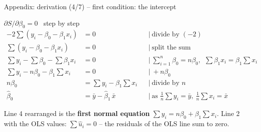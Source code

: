\documentclass[aspectratio=169,11pt]{beamer}
\newcommand{\tsum}{\textstyle\sum}
\begin{document}
\begin{frame}{Appendix: derivation (4/7) -- first condition: the intercept}
  \begin{block}{$\partial S / \partial \beta_0 = 0$ \ step by step}
    \begin{align*}
      -2\tsum (y_i - \beta_0 - \beta_1 x_i) &= 0
        && \mid\ \text{divide by } (-2) \\
      \tsum (y_i - \beta_0 - \beta_1 x_i) &= 0
        && \mid\ \text{split the sum} \\
      \tsum y_i - \tsum \beta_0 - \tsum \beta_1 x_i &= 0
        && \mid\ \tsum_{i=1}^{n} \beta_0 = n\beta_0, \ \ \tsum \beta_1 x_i = \beta_1 \tsum x_i \\
      \tsum y_i - n\beta_0 - \beta_1 \tsum x_i &= 0
        && \mid\ + n\beta_0 \\
      n\beta_0 &= \tsum y_i - \beta_1 \tsum x_i
        && \mid\ \text{divide by } n \\
      \hat{\beta}_0 &= \bar{y} - \hat{\beta}_1\,\bar{x}
        && \mid\ \text{as } \tfrac{1}{n}\tsum y_i = \bar{y}, \ \tfrac{1}{n}\tsum x_i = \bar{x}
    \end{align*}
    \vspace{-14pt}
  \end{block}

  \footnotesize Line 4 rearranged is the \textbf{first normal equation}
  $\sum y_i = n\beta_0 + \beta_1 \sum x_i$. Line 2 with the OLS values:
  $\sum \hat{u}_i = 0$ -- the residuals of the OLS line sum to zero.
\end{frame}
\end{document}

